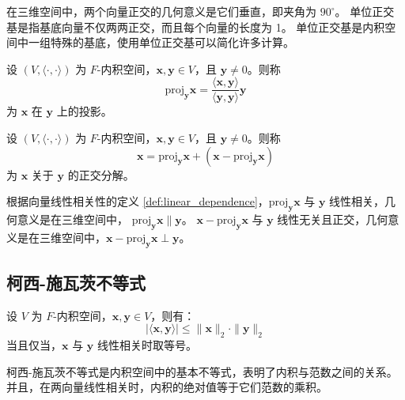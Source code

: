 \begin{note}
    在三维空间中，两个向量正交的几何意义是它们垂直，即夹角为 $90^\circ$。
    单位正交基是指基底向量不仅两两正交，而且每个向量的长度为 1。
    单位正交基是内积空间中一组特殊的基底，使用单位正交基可以简化许多计算。
\end{note}

\vspace{1em}

\begin{definition}[投影 Projection]
    设 $ (V,\langle\cdot,\cdot\rangle) $ 为 $F$-内积空间，$ \mathbf{x},\mathbf{y}\in V $，且 $ \mathbf{y}\neq 0 $。则称
    \[
        \mathrm{proj}_{\mathbf{y}}\mathbf{x} = \frac{\langle \mathbf{x},\mathbf{y}\rangle}{\langle \mathbf{y},\mathbf{y}\rangle}\mathbf{y}
    \]
    为 $ \mathbf{x} $ 在 $ \mathbf{y} $ 上的投影。
    \label{def:projection}
\end{definition}

\begin{definition}
    设 $ (V,\langle\cdot,\cdot\rangle) $ 为 $F$-内积空间，$ \mathbf{x},\mathbf{y}\in V $，且 $ \mathbf{y}\neq 0 $。则称
    \[
        \mathbf{x} = \mathrm{proj}_{\mathbf{y}}\mathbf{x} + (\mathbf{x}-\mathrm{proj}_{\mathbf{y}}\mathbf{x})
    \]
    为 $ \mathbf{x} $ 关于 $ \mathbf{y} $ 的正交分解。
    \label{def:orthogonal_decomposition}
\end{definition}

\begin{note}
    根据向量线性相关性的定义 \ref{def:linear_dependence}，$ \mathrm{proj}_{\mathbf{y}}\mathbf{x} $ 与 $ \mathbf{y} $ 线性相关，几何意义是在三维空间中， $ \mathrm{proj}_{\mathbf{y}}\mathbf{x} \parallel \mathbf{y} $。
    $ \mathbf{x}-\mathrm{proj}_{\mathbf{y}}\mathbf{x} $ 与 $ \mathbf{y} $ 线性无关且正交，几何意义是在三维空间中，$ \mathbf{x}-\mathrm{proj}_{\mathbf{y}}\mathbf{x} \perp \mathbf{y} $。
\end{note}
\vspace{1em}

\subsection{柯西-施瓦茨不等式}
\begin{theorem}
    设 $ V $ 为 $F$-内积空间，$ \mathbf{x},\mathbf{y}\in V $，则有：
    \[
        |\langle \mathbf{x},\mathbf{y}\rangle| \leq \|\mathbf{x}\|_2\cdot\|\mathbf{y}\|_2
    \]
    当且仅当，$ \mathbf{x} $ 与 $ \mathbf{y} $ 线性相关时取等号。
    \label{thm:cauchy_schwarz_inequality}
\end{theorem}

\begin{note}
    柯西-施瓦茨不等式是内积空间中的基本不等式，表明了内积与范数之间的关系。
    并且，在两向量线性相关时，内积的绝对值等于它们范数的乘积。
\end{note}

\newpage